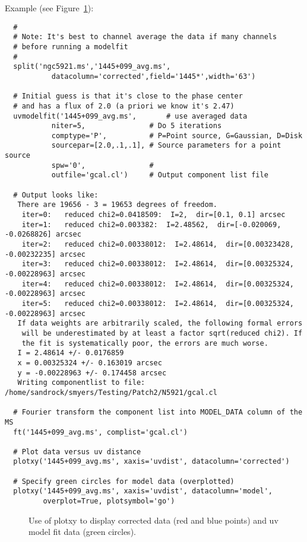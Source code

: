 Example (see Figure~\ref{fig:modelfit}):
\small
\begin{verbatim}
  #
  # Note: It's best to channel average the data if many channels
  # before running a modelfit
  #
  split('ngc5921.ms','1445+099_avg.ms',
           datacolumn='corrected',field='1445*',width='63')

  # Initial guess is that it's close to the phase center
  # and has a flux of 2.0 (a priori we know it's 2.47)
  uvmodelfit('1445+099_avg.ms',       # use averaged data
           niter=5,               # Do 5 iterations
           comptype='P',          # P=Point source, G=Gaussian, D=Disk
           sourcepar=[2.0,.1,.1], # Source parameters for a point source
           spw='0',               # 
           outfile='gcal.cl')     # Output component list file
  
  # Output looks like:
   There are 19656 - 3 = 19653 degrees of freedom.
    iter=0:   reduced chi2=0.0418509:  I=2,  dir=[0.1, 0.1] arcsec
    iter=1:   reduced chi2=0.003382:  I=2.48562,  dir=[-0.020069, -0.0268826] arcsec
    iter=2:   reduced chi2=0.00338012:  I=2.48614,  dir=[0.00323428, -0.00232235] arcsec
    iter=3:   reduced chi2=0.00338012:  I=2.48614,  dir=[0.00325324, -0.00228963] arcsec
    iter=4:   reduced chi2=0.00338012:  I=2.48614,  dir=[0.00325324, -0.00228963] arcsec
    iter=5:   reduced chi2=0.00338012:  I=2.48614,  dir=[0.00325324, -0.00228963] arcsec
   If data weights are arbitrarily scaled, the following formal errors
    will be underestimated by at least a factor sqrt(reduced chi2). If 
    the fit is systematically poor, the errors are much worse.
   I = 2.48614 +/- 0.0176859
   x = 0.00325324 +/- 0.163019 arcsec
   y = -0.00228963 +/- 0.174458 arcsec
   Writing componentlist to file: /home/sandrock/smyers/Testing/Patch2/N5921/gcal.cl

  # Fourier transform the component list into MODEL_DATA column of the MS
  ft('1445+099_avg.ms', complist='gcal.cl')           

  # Plot data versus uv distance
  plotxy('1445+099_avg.ms', xaxis='uvdist', datacolumn='corrected')

  # Specify green circles for model data (overplotted)
  plotxy('1445+099_avg.ms', xaxis='uvdist', datacolumn='model',
         overplot=True, plotsymbol='go') 
\end{verbatim}
\normalsize

\begin{figure}[h!]
\begin{center}
\caption{\label{fig:modelfit} Use of plotxy to display corrected data
  (red and blue points) and uv model fit data (green circles).} 
\hrulefill
\end{center}
\end{figure}

